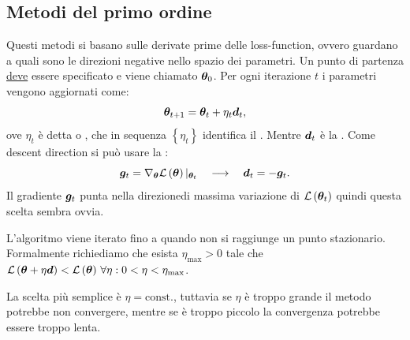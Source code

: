 \documentclass[10pt]{article}
\begin{document}
\subsection{Metodi del primo ordine}
    Questi metodi si basano sulle derivate prime delle loss-function, ovvero guardano
    a quali sono le direzioni negative nello spazio dei parametri. Un punto di partenza
    \underline{deve} essere specificato e viene chiamato \( \bm{\theta}_0 \).
    Per ogni iterazione \(t\) i parametri vengono aggiornati come:
    \begin{equation}
        \bm{\theta}_{t+1} = \bm{\theta}_t + \eta_t \bm{d}_t,
    \end{equation}
    ove \( \eta_t \) è detta  o , che in
    sequenza \( \left\{ \eta_t \right\} \) identifica il . Mentre \( \bm{d}_t \) è la . Come descent
    direction si può usare la :
    \begin{equation}\label{eq:steepest descent}
        \bm{g}_t = \nabla_{\bm{\theta}} \mathcal{L}\left( \bm{\theta} \right)|_{\bm{\theta}_t} \quad \longrightarrow \quad  \bm{d}_t = -\bm{g}_t.
    \end{equation}
    Il gradiente \( \bm{g}_t \) punta nella
    direzionedi massima variazione di \( \mathcal{L}\left( \bm{\theta}_t \right) \)
    quindi questa scelta sembra ovvia.

    L'algoritmo viene iterato fino a quando non si raggiunge un punto stazionario.
    Formalmente richiediamo che esista \( \eta_{\text{max}} > 0 \) tale che
    \( \mathcal{L} \left( \bm{\theta} + \eta\bm{d} \right) < \mathcal{L}\left( \bm{\theta} \right) \,
    \forall\eta : 0<\eta<\eta_{\text{max}}  \). 

    La scelta più semplice è \( \eta = \text{const.} \), tuttavia se \( \eta \) è troppo grande
    il metodo potrebbe non convergere, mentre se è troppo piccolo la convergenza potrebbe
    essere troppo lenta.
\end{document}
